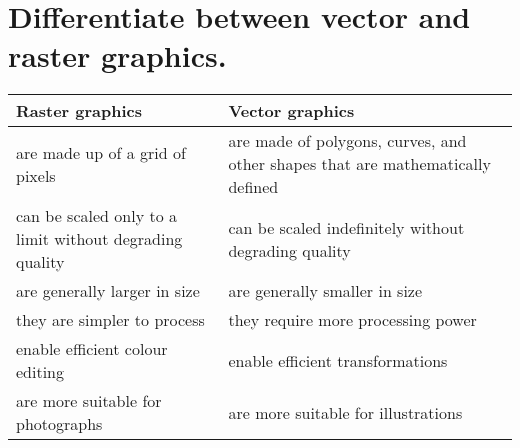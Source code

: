 \section{Differentiate between vector and raster graphics.}

\begin{tabulary}{\textwidth}{L L}
  \centering
  Raster graphics & Vector graphics \\
  \midrule
  are made up of a grid of pixels &
  are made of polygons, curves, and other shapes that are mathematically
  defined \\
  can be scaled only to a limit without degrading quality &
  can be scaled indefinitely without degrading quality \\
  are generally larger in size & are generally smaller in size \\
  they are simpler to process & they require more processing power \\
  enable efficient colour editing & enable efficient transformations \\
  are more suitable for photographs & are more suitable for illustrations \\

\end{tabulary}

